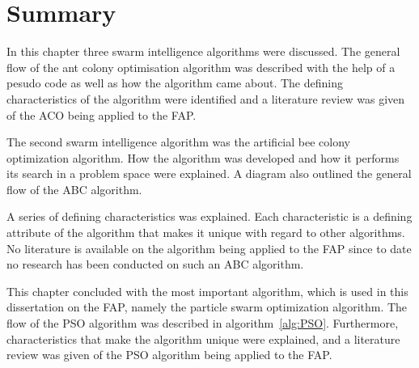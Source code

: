 \section{Summary}
\label{sec:SISummary}
In this chapter three swarm intelligence algorithms were discussed. The general flow of the ant colony optimisation algorithm was described with the help of a pesudo code as well as how the algorithm came about. The defining characteristics of the algorithm were identified and a literature review was given of the \gls{ACO} being applied to the \gls{FAP}.

The second swarm intelligence algorithm was the artificial bee colony optimization algorithm. How the algorithm was developed and how it performs its search in a problem space were explained. A diagram also outlined the general flow of the \gls{ABC} algorithm.

A series of defining characteristics was explained. Each characteristic is a defining attribute of the algorithm that makes it unique with regard to other algorithms. No literature is available on the algorithm being applied to the \gls{FAP} since to date no research has been conducted on such an \gls{ABC} algorithm.

This chapter concluded with the most important algorithm, which is used in this dissertation on the \gls{FAP}, namely the particle swarm optimization algorithm. The flow of the \gls{PSO} algorithm was described in algorithm~\ref{alg:PSO}. Furthermore, characteristics that make the algorithm unique were explained, and a literature review was given of the \gls{PSO} algorithm being applied to the \gls{FAP}.

